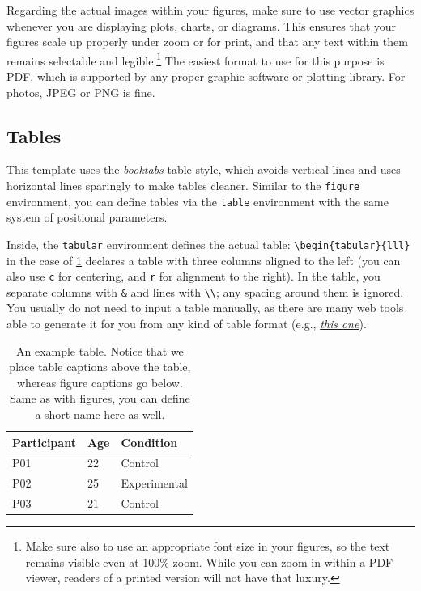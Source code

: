 Regarding the actual images within your figures, make sure to use vector graphics whenever you are displaying plots,
charts, or diagrams. This ensures that your figures scale up properly under zoom or for print, and that any text
within them remains selectable and legible.\footnote{Make sure also to use an appropriate font size in your figures,
so the text remains visible even at 100\% zoom. While you can zoom in within a PDF viewer, readers of a printed
version will not have that luxury.} The easiest format to use for this purpose is PDF, which is supported by any proper
graphic software or plotting library. For photos, JPEG or PNG is fine.

\subsection{Tables}
\label{sec:tables}

This template uses the \emph{booktabs} table style, which avoids vertical lines and uses horizontal lines sparingly
to make tables cleaner. Similar to the \verb|figure| environment, you can define tables via the \verb|table|
environment with the same system of positional parameters.

Inside, the \verb|tabular| environment defines the actual table: \verb|\begin{tabular}{lll}| in the case of
\cref{tab:example} declares a table with three columns aligned to the left (you can also use \verb|c| for centering,
and \verb|r| for alignment to the right). In the table, you separate columns with \verb|&| and lines with \verb|\\|;
any spacing around them is ignored. You usually do not need to input a table manually, as there are many web tools
able to generate it for you from any kind of table format (e.g.,
\emph{\href{https://www.tablesgenerator.com/}{this one}}).

\begin{table}[htb]
    \centering
    \caption[An example table]{An example table. Notice that we place table captions above the table,
    whereas figure captions go below. Same as with figures, you can define a short name here as well.}
    \label{tab:example}
    \begin{tabular}{lll}
        \toprule
        \textbf{Participant} & \textbf{Age} & \textbf{Condition} \\
        \midrule
        P01                  & 22           & Control            \\
        P02                  & 25           & Experimental       \\
        P03                  & 21           & Control            \\
        \bottomrule
    \end{tabular}
\end{table}

